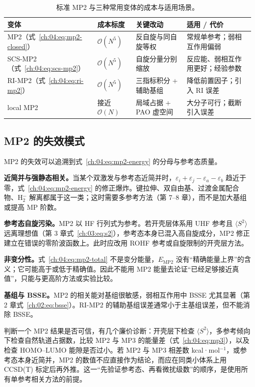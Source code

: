 \begin{table}[t]
\centering
\small
\caption{标准 MP2 与三种常用变体的成本与适用场景。}\label{ch:04:tab:variants}
\begin{tabular}{@{}l p{2.3cm} p{4.6cm} p{3.9cm}@{}}
\toprule
变体 & 成本标度 & 关键改动 & 适用 / 代价 \\
\midrule
MP2（式~\eqref{ch:04:eq:mp2-closed}） & $\mathcal{O}(N^5)$ & 反自旋与同自旋等权 & 常规单参考；弱相互作用偏弱 \\
SCS-MP2（式~\eqref{ch:04:eq:scs-mp2}） & $\mathcal{O}(N^5)$ & 自旋分量分别缩放 & 反应能、弱相互作用更好；经验参数 \\
RI-MP2（式~\eqref{ch:04:eq:ri-mp2}） & $\mathcal{O}(N^5)$ & 三指标积分 + 辅助基组 & 降低前置因子；引入 RI 误差 \\
local MP2 & 接近 $\mathcal{O}(N)$ & 局域占据 + PAO 虚空间 & 大分子可行；截断引入误差 \\
\bottomrule
\end{tabular}
\end{table}

\subsection{MP2 的失效模式}
\label{ch:04:sec:failures}

MP2 的失效可以追溯到式~\eqref{ch:04:eq:mp2-energy} 的分母与参考态质量。

\textbf{近简并与强静态相关。}当某个双激发与参考态近简并时，$\varepsilon_i+\varepsilon_j-\varepsilon_a-\varepsilon_b$ 趋近于零，式~\eqref{ch:04:eq:mp2-energy} 的修正爆炸。键拉伸、双自由基、过渡金属配合物、H$_2^-$ 解离都属于这一类；这时需要多参考方法（第 7--8 章），而不是加大基组或提高 MP 阶数。

\textbf{参考态自旋污染。}MP2 以 HF 行列式为参考。若开壳层体系用 UHF 参考且 $\langle S^2\rangle$ 远离理想值（第 3 章式~\eqref{ch:03:eq:s2}），参考态本身已混入高自旋成分，MP2 修正建立在错误的零阶波函数上。此时应改用 ROHF 参考或自旋限制的开壳层方法。

\textbf{非变分性。}式~\eqref{ch:04:eq:mp2-total} 不是变分能量，$E_{\mathrm{MP2}}$ 没有“精确能量上界”的含义；它可能高于或低于精确值。因此不能用 MP2 能量去论证“已经足够接近真值”，只能与更高阶方法或实验比较。

\textbf{基组与 BSSE。}MP2 的相关能对基组很敏感，弱相互作用中 BSSE 尤其显著（第 2 章式~\eqref{ch:02:eq:bsse}）。RI-MP2 的辅助基组误差通常小于主基组误差，但不能消除 BSSE。

判断一个 MP2 结果是否可信，有几个廉价诊断：开壳层下检查 $\langle S^2\rangle$，多参考倾向下检查自然轨道占据数，比较 MP2 与 MP3 的能量差（式~\eqref{ch:04:eq:mp3}），以及检查 HOMO--LUMO 能隙是否过小。若 MP2 与 MP3 相差数 kcal·mol$^{-1}$，或参考态本身近简并，MP2 的数值不应直接作为结论，而应在同类小体系上用 CCSD(T) 标定后再外推。这一“先验证参考态、再看微扰级数”的顺序，是使用所有单参考相关方法的前提。


